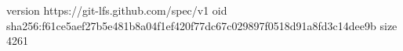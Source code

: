 version https://git-lfs.github.com/spec/v1
oid sha256:f61ce5aef27b5e481b8a04f1ef420f77dc67c029897f0518d91a8fd3c14dee9b
size 4261
